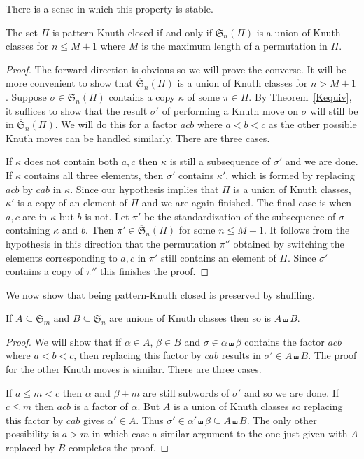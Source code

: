 \documentclass[ALCO,ThmDefs,Unicode,epreuves]{cedram}
\newcommand{\shu}{\shuffle}
\newcommand{\ofS}{\ol{\fS}}
\newcommand{\ol}{\overline}
\newcommand{\sbe}{\subseteq}
\newcommand{\al}{\alpha}
\newcommand{\be}{\beta}
\newcommand{\ka}{\kappa}
\newcommand{\si}{\sigma}
\newcommand{\fS}{{\mathfrak S}}
\begin{document}
There is a sense in which this property is stable.
\begin{lemma}
\label{pkc:M}
The set $\Pi$ is pattern-Knuth closed if and only if $\fS_n(\Pi)$ is a union of Knuth classes for $n\le M+1$ where $M$ is the maximum length of a permutation in $\Pi$.
\end{lemma}
\begin{proof}
The forward direction is obvious so we will prove the converse. It will be more convenient to show that $\ofS_n(\Pi)$ is a union of Knuth classes for $n>M+1$. Suppose $\si\in\ofS_n(\Pi)$ contains a copy $\ka$ of some $\pi\in\Pi$. By Theorem~\ref{Kequiv}, it suffices to show that the result $\si'$ of performing a Knuth move on $\si$ will still be in $\ofS_n(\Pi)$. We will do this for a factor $acb$ where $a<b<c$ as the other possible Knuth moves can be handled similarly. There are three cases.

If $\ka$ does not contain both $a,c$ then $\ka$ is still a subsequence of $\si'$ and we are done. If $\ka$ contains all three elements, then $\si'$ contains $\ka'$, which is formed by replacing $acb$ by $cab$ in $\ka$. Since our hypothesis implies that $\Pi$ is a union of Knuth classes, $\ka'$ is a copy of an element of $\Pi$ and we are again finished. The final case is when $a,c$ are in $\ka$ but $b$ is not. Let $\pi'$ be the standardization of the subsequence of $\si$ containing $\ka$ and $b$. Then $\pi'\in\ofS_n(\Pi)$ for some $n\le M+1$. It follows from the hypothesis in this direction that the permutation $\pi''$ obtained by switching the elements corresponding to $a,c$ in $\pi'$ still contains an element of $\Pi$. Since $\si'$ contains a copy of $\pi''$ this finishes the proof.
\end{proof}

We now show that being pattern-Knuth closed is preserved by shuffling.
\begin{lemma}
\label{pkc:shu}
If $A\sbe\fS_m$ and $B\sbe\fS_n$ are unions of Knuth classes then so is $A\shu B$.
\end{lemma}
\begin{proof}
We will show that if $\al\in A$, $\be\in B$ and $\si\in \al\shu\be$ contains the factor $acb$ where $a<b<c$, then replacing this factor by $cab$ results in $\si'\in A\shu B$. The proof for the other Knuth moves is similar. There are three cases.

If $a\le m< c$ then $\al$ and $\be+m$ are still subwords of $\si'$ and so we are done. If $c\le m$ then $acb$ is a factor of $\al$. But $A$ is a union of Knuth classes so replacing this factor by $cab$ gives $\al'\in A$. Thus $\si'\in\al'\shu\be \sbe A\shu B$. The only other possibility is $a>m$ in which case a similar argument to the one just given with $A$ replaced by $B$ completes the proof.
\end{proof}
\end{document}

